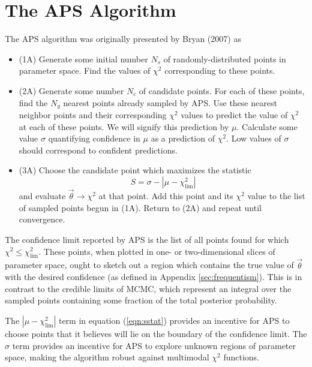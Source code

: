 \documentclass[useAMS,usenatbib]{aastex}
\begin{document}
\section{The APS Algorithm}
\label{sec:algorithm}

The APS algorithm was originally presented by Bryan (2007) as

\begin{itemize}
\item(1A) Generate some initial number $N_s$ of randomly-distributed points in 
parameter space.  Find the values of $\chi^2$ corresponding to these points.
\\
\item(2A) Generate some number $N_c$ of candidate points.  
For each of these points, find the $N_g$ nearest points already sampled
by APS. Use these nearest neighbor points and their corresponding $\chi^2$ values
to predict the value of $\chi^2$ at each of these points.
 We will signify this prediction by $\mu$.  Calculate some value $\sigma$
 quantifying confidence in $\mu$ as a prediction of $\chi^2$.  Low values of
 $\sigma$ should correspond to confident predictions.
 \\
\item(3A) Choose the candidate point which maximizes the statistic
\begin{equation}
\label{eqn:sstat}
S=\sigma-|\mu-\chi^2_\text{lim}|
\end{equation}
and evaluate $\vec{\theta}\rightarrow\chi^2$ at that point.  Add this point and
its $\chi^2$ value to the list of sampled points begun in (1A). 
Return to (2A) and repeat until convergence.
\\
\end{itemize}
The confidence limit reported by APS is the list of all points found
for which $\chi^2\le\chi^2_\text{lim}$.  
These points, when plotted in one- or two-dimensional slices of parameter
space, ought to sketch out a region which contains the true value of $\vec{\theta}$
with the desired confidence (as defined in Appendix \ref{sec:frequentism}).
This is in contrast to the credible
limits of MCMC, which represent an integral over the sampled points containing some
fraction of the total posterior probability.

The $|\mu-\chi^2_\text{lim}|$ term in equation (\ref{eqn:sstat}) provides an
incentive for APS to choose points that it believes will lie on the boundary of
the confidence limit.  
The $\sigma$ term provides an incentive for APS to explore unknown regions of
parameter space, making the algorithm robust against multimodal $\chi^2$
functions.  
\end{document}
